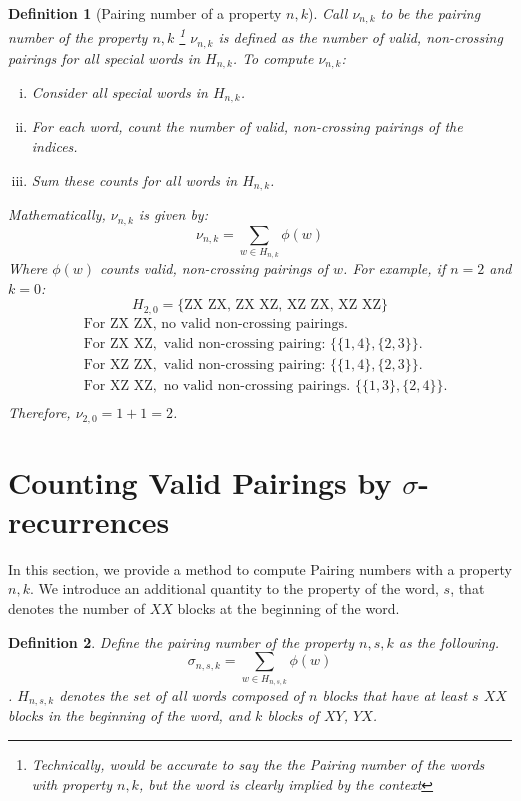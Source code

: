 \documentclass{article}
\newcommand{\Eta}{H}
\newtheorem{definition}{Definition}
\begin{document}
\begin{definition}[Pairing number of a property $n, k$]
    Call \(\nu_{n, k}\) to be the pairing number of the property $n, k$
    \footnote{Technically, would be accurate to say the the Pairing number 
    of the words with property $n, k$, but the word is clearly implied by the context}
\(\nu_{n, k}\) is defined as the number of valid, non-crossing pairings for all special words in \(\Eta_{n, k}\). To compute \(\nu_{n, k}\):

\begin{enumerate}[(i)]
    \item Consider all special words in \(\Eta_{n, k}\).
    \item For each word, count the number of valid, non-crossing pairings of the indices.
    \item Sum these counts for all words in \(\Eta_{n, k}\).
\end{enumerate}

Mathematically, \(\nu_{n, k}\) is given by:
\[
\nu_{n, k} = \sum_{w \in \Eta_{n, k}} \phi(w)
\]
Where $\phi(w)$ counts valid, non-crossing pairings of $w$. 
\newpage
For example, if \(n = 2\) and \(k = 0\):
\[
\Eta_{2, 0} = \{\text{ZX ZX}, \, \text{ZX XZ}, \, \text{XZ ZX}, \, \text{XZ XZ}\}
\]
\[
\begin{aligned}
&\text{For } \text{ZX ZX}, \text{ no valid non-crossing pairings.} \\
&\text{For } \text{ZX XZ}, \text{ valid non-crossing pairing: } \{\{1, 4\}, \{2, 3\}\}. \\
&\text{For } \text{XZ ZX}, \text{ valid non-crossing pairing: } \{\{1, 4\}, \{2, 3\}\}. \\
&\text{For } \text{XZ XZ}, \text{ no valid non-crossing pairings. } \{\{1, 3\}, \{2, 4\}\}. \\
\end{aligned}
\]
Therefore, \(\nu_{2, 0} = 1 + 1 = 2\).
\end{definition}


\section{Counting Valid Pairings by $\sigma$-recurrences}

In this section, we provide a method to compute Pairing numbers 
with a property $n, k$. We introduce an additional quantity to the property 
of the word, $s$, that denotes the number of $XX$ blocks at the beginning 
of the word. 

\begin{definition}
    Define the pairing number of the property $n, s, k$ as the following. 
    \[
\sigma_{n, s, k} = \sum_{w \in \Eta_{n, s, k}} \phi(w)
\]. 
$\Eta_{n, s, k}$ denotes the set of all words composed of $n$ blocks that have at least
$s$ $XX$ blocks in the beginning of the word, and $k$ blocks of $XY$, $YX$. 
\end{definition}
\end{document}
